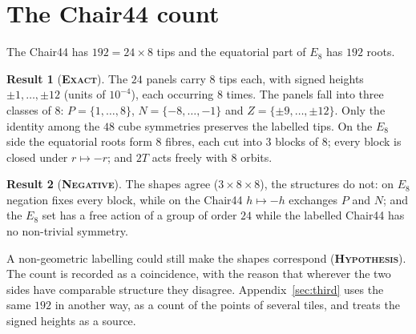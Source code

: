 \documentclass[11pt]{article}
\newcommand{\exact}{\textbf{\textsc{Exact}}}
\newcommand{\hypo}{\textbf{\textsc{Hypothesis}}}
\newcommand{\negres}{\textbf{\textsc{Negative}}}
\theoremstyle{definition}
\newtheorem{result}{Result}
\begin{document}
\section{The Chair44 count}\label{sec:chair}
The Chair44 has $192=24\times8$ tips and the equatorial part of $E_8$ has $192$ roots.
\begin{result}[\exact]\label{res:chair}
The $24$ panels carry $8$ tips each, with signed heights $\pm1,\dots,\pm12$ (units of $10^{-4}$), each occurring $8$ times. The panels fall into three classes of $8$: $P=\{1,\dots,8\}$, $N=\{-8,\dots,-1\}$ and $Z=\{\pm9,\dots,\pm12\}$. Only the identity among the $48$ cube symmetries preserves the labelled tips. On the $E_8$ side the equatorial roots form $8$ fibres, each cut into $3$ blocks of $8$; every block is closed under $r\mapsto-r$; and $2T$ acts freely with $8$ orbits.
\end{result}
\begin{result}[\negres]\label{res:chair-neg}
The shapes agree ($3\times8\times8$), the structures do not: on $E_8$ negation fixes every block, while on the Chair44 $h\mapsto-h$ exchanges $P$ and $N$; and the $E_8$ set has a free action of a group of order $24$ while the labelled Chair44 has no non-trivial symmetry.
\end{result}
A non-geometric labelling could still make the shapes correspond (\hypo). The count is recorded as a coincidence, with the reason that wherever the two sides have comparable structure they disagree. Appendix~\ref{sec:third} uses the same $192$ in another way, as a count of the points of several tiles, and treats the signed heights as a source.


\end{document}
